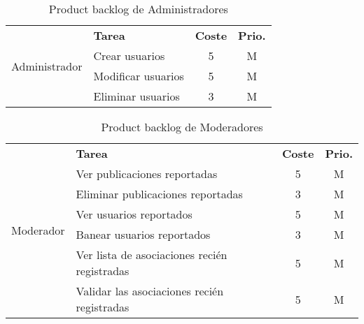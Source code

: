 \begin{table}[H]
    \centering
    \begin{tabular}{|c|p{8cm}|c|c|} \hline 
         \multirow[c]{4}{*}{Administrador}&  \textbf{Tarea}&  \textbf{Coste}& \textbf{Prio.}\\  \cline{2-4}
         &  Crear usuarios &  5& M\\ \cline{2-4}
         &  Modificar usuarios &  5& M\\ \cline{2-4}
         &  Eliminar usuarios &  3& M\\ \hline

         
         
    \end{tabular}
    \caption{Product backlog de Administradores}
    \label{tab:pb_administradores}
\end{table}

\begin{table}[H]
    \centering
    \begin{tabular}{|c|p{8cm}|c|c|} \hline 
         \multirow[c]{7}{*}{Moderador}&  \textbf{Tarea}&  \textbf{Coste}& \textbf{Prio.}\\  \cline{2-4}
         &  Ver publicaciones reportadas &  5& M\\ \cline{2-4}
         &  Eliminar publicaciones reportadas &  3& M\\ \cline{2-4}

         &  Ver usuarios reportados &  5& M\\ \cline{2-4}
         &  Banear usuarios reportados &  3& M\\ \cline{2-4}
         
         &  Ver lista de asociaciones recién registradas &  5& M\\ \cline{2-4}
         &  Validar las asociaciones recién registradas& 5 & M\\ \hline

         
         
    \end{tabular}
    \caption{Product backlog de Moderadores}
    \label{tab:pb_moderadores}
\end{table}